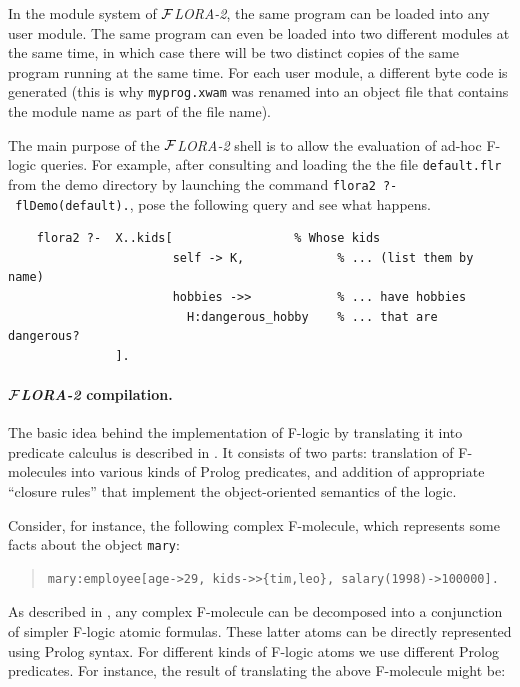\documentclass[11pt]{article}
\newcommand{\FLORA}{{\mbox{${\cal F}${\small\it LORA}\rm\emph{-2}}}\xspace}
\newcommand{\fl}{\mbox{F-logic}\xspace}
\newcommand{\ofile}{xwam}
\begin{document}
In the module system of \FLORA, the same program can be loaded into any
user module. The same program can even be loaded into two different
modules at the same time, in which case there will be two distinct copies
of the same program running at the same time. For each user module, a different
byte code is generated (this is why {\tt myprog.\ofile} was renamed into an
object file that contains the module name as part of the file name).

The main purpose of the \FLORA shell is to allow the evaluation
of ad-hoc \fl queries. For example, after consulting and loading the
the file \texttt{default.flr} from the demo directory by launching
the command \texttt{flora2~?-~flDemo(default).}, pose the following query
and see what happens.
\begin{verbatim}
    flora2 ?-  X..kids[                 % Whose kids
                       self -> K,             % ... (list them by name)
                       hobbies ->>            % ... have hobbies
                         H:dangerous_hobby    % ... that are dangerous?
               ]. 
\end{verbatim}


\paragraph{\FLORA compilation.}
The basic idea behind the implementation of \fl by translating it into
predicate calculus is described in \cite{KLW95}. It consists of two parts:
translation of F-molecules into various kinds of Prolog predicates, and
addition of appropriate ``closure rules'' that implement the
object-oriented semantics of the logic.

Consider, for instance, the following complex F-molecule, which represents
some facts about the object \texttt{mary}:

\begin{quote}
\begin{verbatim}
mary:employee[age->29, kids->>{tim,leo}, salary(1998)->100000].
\end{verbatim}
\end{quote}

As described in \cite{KLW95}, any complex F-molecule can be
decomposed into a conjunction of simpler \fl atomic formulas. These
latter atoms can be directly represented using Prolog syntax.  For
different kinds of \fl atoms we use different Prolog predicates. For
instance, the result of translating the above F-molecule might be:
\end{document}
